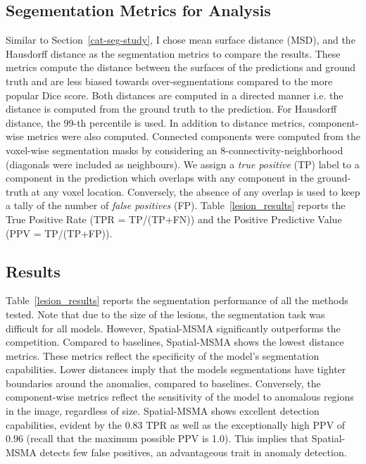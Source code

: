 \subsection*{Segementation Metrics for Analysis}
Similar to Section~\ref{cat-seg-study}, I chose mean surface distance (MSD), and the Hausdorff distance as the segmentation metrics to compare the results. These metrics compute the distance between the surfaces of the predictions and ground truth and are less biased towards over-segmentations compared to the more popular Dice score. Both distances are computed in a directed manner i.e. the distance is computed from the ground truth to the prediction. For Hausdorff distance, the 99-th percentile is used. In addition to distance metrics, component-wise metrics were also computed. Connected components were computed from the voxel-wise segmentation masks by considering an 8-connectivity-neighborhood (diagonals were included as neighbours). We assign a \textit{true positive} (TP) label to a component in the prediction which overlaps with any component in the ground-truth at any voxel location. Conversely, the absence of any overlap is used to keep a tally of the number of \textit{false positives} (FP). Table~\ref{lesion_results} reports the True Positive Rate (TPR = TP/(TP+FN)) and the Positive Predictive Value (PPV = TP/(TP+FP)). 

\subsection*{Results}

Table~\ref{lesion_results} reports the segmentation performance of all the methods tested. Note that due to the size of the lesions, the segmentation task was difficult for all models. However, Spatial-MSMA significantly outperforms the competition. Compared to baselines, Spatial-MSMA shows the lowest distance metrics. These metrics reflect the specificity of the model's segmentation capabilities. Lower distances imply that the models segmentations have tighter boundaries around the anomalies, compared to baselines. Conversely, the component-wise metrics reflect the sensitivity of the model to anomalous regions in the image, regardless of size. Spatial-MSMA shows excellent detection capabilities, evident by the $0.83$ TPR as well as the exceptionally high PPV of $0.96$ (recall that the maximum possible PPV is 1.0). This implies that Spatial-MSMA detects few false positives, an advantageous trait in anomaly detection.

